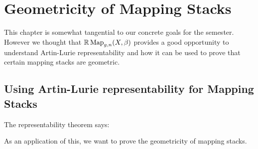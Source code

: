 \chapter{Geometricity of Mapping Stacks}
\label{ch3:geom}

This chapter is somewhat tangential to our concrete goals for the semester. However we thought that $\mathbb R\operatorname{Map}_{g,n}(X,\beta)$
provides a good opportunity to understand Artin-Lurie representability and how it can be used to prove that certain
mapping stacks are geometric.


\section{Using Artin-Lurie representability for Mapping Stacks}
The representability theorem says:

\begin{thm}
\end{thm}

As an application of this, we want to prove the geometricity of mapping stacks.

